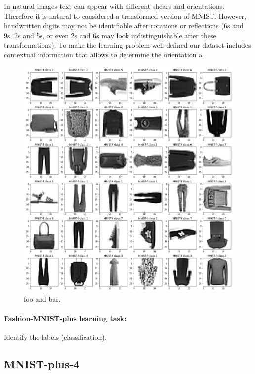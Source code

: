 \documentclass{article}
\begin{document}
In natural images text can appear with different shears and orientations. Therefore it is natural to considered a transformed version of MNIST. However, handwritten digits may not be identifiable after rotations or reflections (6s and 9s, 2s and 5s, or even 2s and 6s may look indistinguishable after these transformations). To make the learning problem well-defined our dataset includes contextual information that allows to determine the orientation a

\begin{figure}[t!]
\includegraphics[width=\textwidth]{../notebooks/MNIST-f.png}
\caption{foo and bar.\label{fig:f}}
\end{figure}

\paragraph{Fashion-MNIST-plus learning task:} Identify the labels (classification).

\subsection{MNIST-plus-4}
\end{document}
